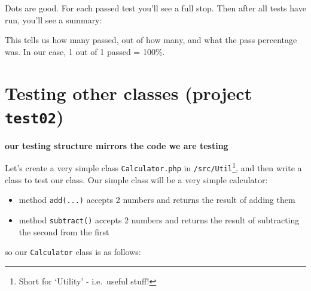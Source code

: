 \documentclass[a4paperpaper,openright]{book}
\newenvironment{Shaded}{}{}
\newcommand{\ExtensionTok}[1]{#1}
\newcommand{\KeywordTok}[1]{\textcolor[rgb]{0.00,0.44,0.13}{\textbf{#1}}}
\newcommand{\NormalTok}[1]{#1}
\newcommand{\OtherTok}[1]{\textcolor[rgb]{0.00,0.44,0.13}{#1}}
\begin{document}
Dots are good. For each passed test you'll see a full stop. Then after
all tests have run, you'll see a summary:

\begin{Shaded}
\end{Shaded}

This tells us how many passed, out of how many, and what the pass
percentage was. In our case, 1 out of 1 passed = 100\%.

\hypertarget{testing-other-classes-project-test02}{%
\section{\texorpdfstring{Testing other classes (project
\texttt{test02})}{Testing other classes (project test02)}}\label{testing-other-classes-project-test02}}

\textbf{our testing structure mirrors the code we are testing}

Let's create a very simple class \texttt{Calculator.php} in
\texttt{/src/Util}\footnote{Short for `Utility' - i.e.~useful stuff!},
and then write a class to test our class. Our simple class will be a
very simple calculator:

\begin{itemize}
\item
  method \texttt{add(...)} accepts 2 numbers and returns the result of
  adding them
\item
  method \texttt{subtract()} accepts 2 numbers and returns the result of
  subtracting the second from the first
\end{itemize}

so our \texttt{Calculator} class is as follows:

\begin{Shaded}
\end{Shaded}
\end{document}
